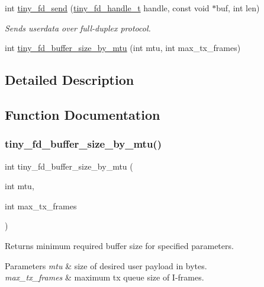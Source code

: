 \begin{DoxyCompactItemize}
int \hyperlink{group__FULL__DUPLEX__API_ga490157ee98ea6148f99a5bb1f26c5f60}{tiny\+\_\+fd\+\_\+send} (\hyperlink{tiny__fd_8h_a91e6b79431fe38570fb102701ef0b7e8}{tiny\+\_\+fd\+\_\+handle\+\_\+t} handle, const void $\ast$buf, int len)
\begin{DoxyCompactList}\small\item\em Sends userdata over full-\/duplex protocol. \end{DoxyCompactList}\item 
int \hyperlink{group__FULL__DUPLEX__API_ga19789bea5b5acd68804773f0d6b0e3f7}{tiny\+\_\+fd\+\_\+buffer\+\_\+size\+\_\+by\+\_\+mtu} (int mtu, int max\+\_\+tx\+\_\+frames)
\end{DoxyCompactItemize}


\subsection{Detailed Description}


\subsection{Function Documentation}
\mbox{\label{group__FULL__DUPLEX__API_ga19789bea5b5acd68804773f0d6b0e3f7}} 
\subsubsection{\texorpdfstring{tiny\+\_\+fd\+\_\+buffer\+\_\+size\+\_\+by\+\_\+mtu()}{tiny\_fd\_buffer\_size\_by\_mtu()}}
{\footnotesize\ttfamily int tiny\+\_\+fd\+\_\+buffer\+\_\+size\+\_\+by\+\_\+mtu (\begin{DoxyParamCaption}\item[{int}]{mtu,  }\item[{int}]{max\+\_\+tx\+\_\+frames }\end{DoxyParamCaption})}

Returns minimum required buffer size for specified parameters. 
\begin{DoxyParams}{Parameters}
{\em mtu} & size of desired user payload in bytes. \\
\hline
{\em max\+\_\+tx\+\_\+frames} & maximum tx queue size of I-\/frames. \\
\hline
\end{DoxyParams}
\mbox{\label{group__FULL__DUPLEX__API_ga11e470503e3359bc29a5bcb65a9771d5}} 
